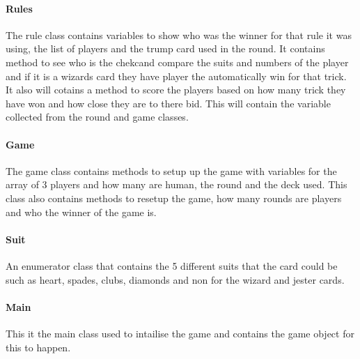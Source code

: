 \paragraph{Rules}
The rule class contains variables to show who was the winner for that rule it was using, the list of players and the trump card used in the round. It contains method to see who is the chekcand compare the suits and numbers of the player and if it is a wizards card they have player the automatically win for that trick.  It also will cotains a method to score the players based on how many trick they have won and how close they are to there bid. This will contain the variable collected from the round and game classes.
\paragraph{Game}
The game class contains methods to setup up the game with variables for the array of 3 players and how many are human, the round  and the deck used. This class also contains methods to resetup the game, how many rounds are players and who the winner of the game is. 
\paragraph{Suit}
An enumerator class that contains the 5 different suits that the card could be such as heart, spades, clubs, diamonds and non for the wizard and jester cards.
\paragraph{Main}
This it the main class used to intailise the game and contains the game object for this to happen.
